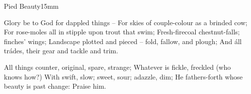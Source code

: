\begin{poem}{Pied Beauty}{15mm}
  \begin{stanza}
  Glory be to God for dappled things –
  \quad   For skies of couple-colour as a brinded cow;
  \qquad    For rose-moles all in stipple upon trout that swim;
Fresh-firecoal chestnut-falls; finches’ wings;
  \quad Landscape plotted and pieced – fold, fallow, and plough;
  \qquad    And áll trádes, their gear and tackle and trim.
\end{stanza}
\begin{stanza}
All things counter, original, spare, strange;
\quad   Whatever is fickle, freckled (who knows how?)
\qquad      With swift, slow; sweet, sour; adazzle, dim;
He fathers-forth whose beauty is past change:
\hfill                                Praise him.\qquad
\end{stanza}
\end{poem}
